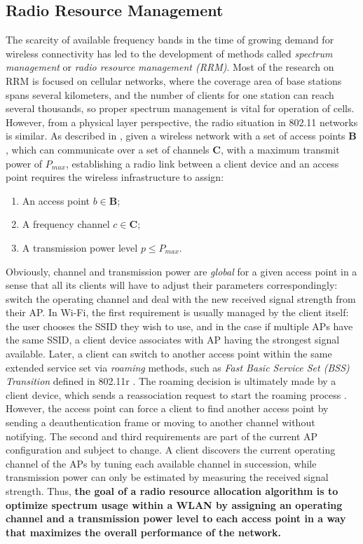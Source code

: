 \subsection{Radio Resource Management}
\label{chap:intro:sec:rrm}
The scarcity of available frequency bands in the time of growing demand for wireless connectivity has led to the development of methods called \textit{spectrum management} or \textit{radio resource management (RRM)}. Most of the research on RRM is focused on cellular networks, where the coverage area of base stations spans several kilometers, and the number of clients for one station can reach several thousands, so proper spectrum management is vital for operation of cells. However, from a physical layer perspective, the radio situation in 802.11 networks is similar. As described in \cite{zanderRadioResourceManagement1997}, given a wireless network with a set of access points $\boldsymbol{B}$, which can communicate over a set of channels $\boldsymbol{C}$, with a maximum transmit power of $P_{max}$, establishing a radio link between a client device and an access point requires the wireless infrastructure to assign:
\begin{enumerate}
    \item An access point $b \in \boldsymbol{B}$;
    \item A frequency channel $c \in \boldsymbol{C}$;
    \item A transmission power level $ p \leq P_{max}$.
\end{enumerate}
Obviously, channel and transmission power are \textit{global} for a given access point in a sense that all its clients will have to adjust their parameters correspondingly: switch the operating channel and deal with the new received signal strength from their AP.
In Wi-Fi, the first requirement is usually managed by the client itself: the user chooses the SSID they wish to use, and in the case if multiple APs have the same SSID, a client device associates with AP having the strongest signal available. Later, a client can switch to another access point within the same extended service set via \textit{roaming} methods, such as \textit{Fast Basic Service Set (BSS) Transition} defined in 802.11r \cite{80211r2008IEEE}. The roaming decision is ultimately made by a client device, which sends a reassociation request to start the roaming process \cite{colemanCWNACertifiedWireless2021}. However, the access point can force a client to find another access point by sending a deauthentication frame or moving to another channel without notifying.
The second and third requirements are part of the current AP configuration and subject to change. A client discovers the current operating channel of the APs by tuning each available channel in succession, while transmission power can only be estimated by measuring the received signal strength.
Thus, \textbf{the goal of a radio resource allocation algorithm is to optimize spectrum usage within a WLAN by assigning an operating channel and a transmission power level to each access point in a way that maximizes the overall performance of the network.}

